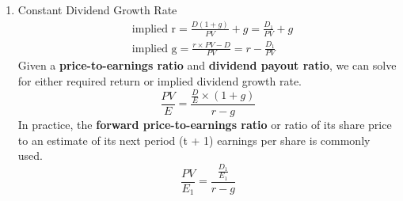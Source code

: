 \begin{enumerate}
	\item Constant Dividend Growth Rate
	      \begin{align*}
		       & \text{implied r} = \frac{D(1+g)}{PV} + g = \frac{D_{1}}{PV} + g            \\
		       & \text{implied g} = \frac{r \times PV - D}{PV} = r - \frac{D_{1}}{PV}
	      \end{align*}
	      Given a \textbf{price-to-earnings ratio} and \textbf{dividend payout ratio},
	      we can solve for either required return or implied dividend growth rate.
	      \begin{equation*}
		      \frac{PV}{E} = \frac{\displaystyle \frac{D}{E} \times (1+g)}{r - g}
	      \end{equation*}
	      In practice, the \textbf{forward price-to-earnings ratio}
	      or ratio of its share price to an estimate of its next period (t + 1)
	      earnings per share is commonly used.
	      \begin{equation*}
		      \frac{PV}{E_{1}} = \frac{\displaystyle \frac{D_{1}}{E_{1}}}{r - g}
	      \end{equation*}
\end{enumerate}

